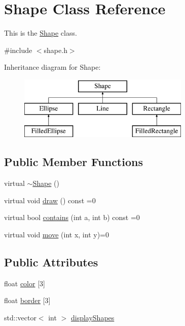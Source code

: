 \hypertarget{classShape}{\section{Shape Class Reference}
\label{classShape}
}


This is the \hyperlink{classShape}{Shape} class.  




{\ttfamily \#include $<$shape.\-h$>$}

Inheritance diagram for Shape\-:\begin{figure}[H]
\begin{center}
\leavevmode
\includegraphics[height=3.000000cm]{classShape}
\end{center}
\end{figure}
\subsection*{Public Member Functions}
\begin{DoxyCompactItemize}
\item 
virtual \hyperlink{classShape_ac3b9fc48965274893f25b18aa14ba665}{$\sim$\-Shape} ()
\item 
virtual void \hyperlink{classShape_a0d778013ae2532b958c8403155b36b7a}{draw} () const =0
\item 
virtual bool \hyperlink{classShape_abd90f6afcbacf45d1bcccc8225243101}{contains} (int a, int b) const =0
\item 
virtual void \hyperlink{classShape_a140551e1a4fc2c4d8cf8d2e01c5a5932}{move} (int x, int y)=0
\end{DoxyCompactItemize}
\subsection*{Public Attributes}
\begin{DoxyCompactItemize}
\item 
float \hyperlink{classShape_a9f925188936af909e796807fc75c1501}{color} \mbox{[}3\mbox{]}
\item 
float \hyperlink{classShape_ac4439415a7e663a7088fe36244cefaca}{border} \mbox{[}3\mbox{]}
\item 
std\-::vector$<$ int $>$ \hyperlink{classShape_affa8864633ce066ea626eb50fb4d7584}{display\-Shapes}
\end{DoxyCompactItemize}


